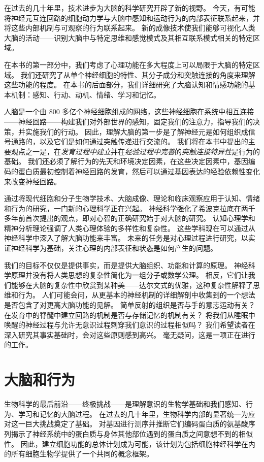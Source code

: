 在过去的几十年里，技术进步为大脑的科学研究开辟了新的视野。
今天，有可能将神经元互连回路的细胞动力学与大脑中感知和运动行为的内部表征联系起来，并将这些内部机制与可观察的行为联系起来。
新的成像技术使我们能够可视化人类大脑的活动——识别大脑中与特定思维和感觉模式及其相互联系模式相关的特定区域。


在本书的第一部分中，我们考虑了心理功能在多大程度上可以局限于大脑的特定区域。
我们还研究了从单个神经细胞的特性、其分子成分和突触连接的角度来理解这些功能的程度。
在本书的后面部分，我们详细研究了大脑认知和情感功能的基本机制：感知、行动、动机、情绪、学习和记忆。


人脑是一个由 800 多亿个神经细胞组成的网络，这些神经细胞在系统中相互连接——神经回路——构建我们对外部世界的感知，固定我们的注意力，指导我们的决策，并实施我们的行动。
因此，理解大脑的第一步是了解神经元是如何组织成信号通路的，以及它们是如何通过突触传递进行交流的。
我们将在本书中提出的主要观点之一是，在\textit{发育过程中建立}并在\textit{经验过程中完善}的\textit{突触连接特异性}是行为的基础。
我们还必须了解行为的先天和环境决定因素，在这些决定因素中，基因编码的蛋白质最初控制着神经回路的发育，然后可以通过基因表达的经验依赖性变化来改变神经回路。


通过将现代细胞和分子生物学技术、大脑成像、理论和临床观察应用于认知、情绪和行为的研究，一门新的心理科学正在兴起。
神经科学强化了希波克拉底在两千多年前首次提出的观点，即对心智的正确研究始于对大脑的研究。
认知心理学和精神分析理论强调了人类心理体验的多样性和复杂性。
这些学科现在可以通过从神经科学中深入了解大脑功能来丰富。
未来的任务是对心理过程进行研究，以实证神经科学为基础，关注心理的内部表征和状态是如何产生的问题。


我们的目标不仅仅是提供事实，而是提供大脑组织、功能和计算的原理。
神经科学原理并没有将人类思想的复杂性简化为一组分子或数学公理。
相反，它们让我们能够在大脑的复杂性中欣赏到某种美——达尔文式的优雅，这种复杂性解释了思维和行为。
人们可能会问，从更基本的神经机制的详细解剖中收集到的一个想法是否包含了对更高大脑功能的见解。
简单反射的组织是否与手的意志运动有关？
在发育中的脊髓中建立回路的机制是否与存储记忆的机制有关？
将我们从睡眠中唤醒的神经过程与允许无意识过程刺穿我们意识的过程相似吗？
我们希望读者在深入研究其事实基础时，会对这些原则感到高兴。
毫无疑问，这是一项正在进行的工作。





\chapter{大脑和行为} \label{chap:chap1}
生物科学的最后前沿——终极挑战——是理解意识的生物学基础和我们感知、行为、学习和记忆的大脑过程。 
在过去的几十年里，生物科学内部的显著统一为应对这一巨大挑战奠定了基础。 
对基因进行测序并推断它们编码蛋白质的氨基酸序列揭示了神经系统中的蛋白质与身体其他部位遇到的蛋白质之间意想不到的相似性。 
因此，建立细胞功能的总体计划成为可能，该计划为包括细胞神经科学在内的所有细胞生物学提供了一个共同的概念框架。


